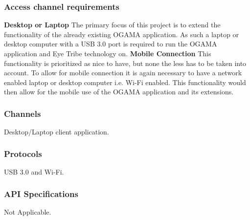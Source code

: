 \subsubsection{Access channel requirements}
\textbf{Desktop or Laptop}
\newline
The primary focus of this project is to extend the functionality of the already existing OGAMA application. As such a laptop or desktop computer with a USB 3.0 port is required to run the OGAMA application and Eye Tribe technology on.
\newline
\textbf{Mobile Connection}
\newline
 This functionality is prioritized as nice to have, but none the less has to be taken into account. To allow for mobile connection it is again necessary to have a network enabled laptop or desktop computer i.e. Wi-Fi enabled. This functionality would then allow for the mobile use of the OGAMA application and its extensions.\newline 

\subsubsection{Channels}
Desktop/Laptop client application.
\subsubsection{Protocols}
USB 3.0 and Wi-Fi.
\subsubsection{API Specifications}
Not Applicable.
